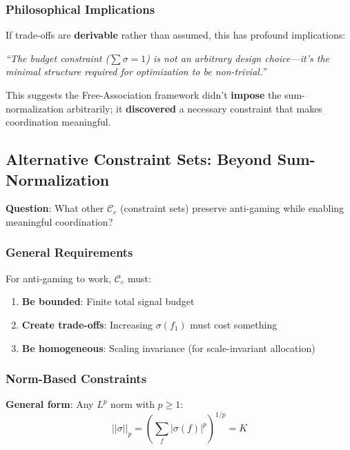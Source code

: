 \documentclass[11pt,a4paper]{article}
\theoremstyle{definition}
\theoremstyle{remark}
\begin{document}
\subsubsection{Philosophical Implications}

If trade-offs are \textbf{derivable} rather than assumed, this has profound implications:

\begin{center}
\textit{``The budget constraint ($\sum \sigma = 1$) is not an arbitrary design choice—it's the}\\
\textit{minimal structure required for optimization to be non-trivial.''}
\end{center}

This suggests the Free-Association framework didn't \textbf{impose} the sum-normalization arbitrarily; it \textbf{discovered} a necessary constraint that makes coordination meaningful.

\subsection{Alternative Constraint Sets: Beyond Sum-Normalization}
\label{sec:alternative-constraints}

\textbf{Question}: What other $\mathcal{C}_e$ (constraint sets) preserve anti-gaming while enabling meaningful coordination?

\subsubsection{General Requirements}

For anti-gaming to work, $\mathcal{C}_e$ must:
\begin{enumerate}
\item \textbf{Be bounded}: Finite total signal budget
\item \textbf{Create trade-offs}: Increasing $\sigma(f_1)$ must cost something
\item \textbf{Be homogeneous}: Scaling invariance (for scale-invariant allocation)
\end{enumerate}

\subsubsection{Norm-Based Constraints}

\textbf{General form}: Any $L^p$ norm with $p \ge 1$:
\[ ||\sigma||_p = \left(\sum_{f} |\sigma(f)|^p\right)^{1/p} = K \]
\end{document}
